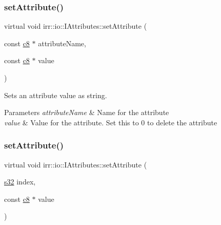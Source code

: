 \subsubsection{\texorpdfstring{set\+Attribute()}{setAttribute()}\hspace{0.1cm}{\footnotesize\ttfamily [1/5]}}
{\footnotesize\ttfamily virtual void irr\+::io\+::\+I\+Attributes\+::set\+Attribute (\begin{DoxyParamCaption}\item[{const \hyperlink{namespaceirr_a9395eaea339bcb546b319e9c96bf7410}{c8} $\ast$}]{attribute\+Name,  }\item[{const \hyperlink{namespaceirr_a9395eaea339bcb546b319e9c96bf7410}{c8} $\ast$}]{value }\end{DoxyParamCaption})\hspace{0.3cm}{\ttfamily [pure virtual]}}



Sets an attribute value as string. 


\begin{DoxyParams}{Parameters}
{\em attribute\+Name} & Name for the attribute \\
\hline
{\em value} & Value for the attribute. Set this to 0 to delete the attribute \\
\hline
\end{DoxyParams}
\mbox{\label{classirr_1_1io_1_1IAttributes_a0d270e61c06e6553857f90946fe177f7}} 
\subsubsection{\texorpdfstring{set\+Attribute()}{setAttribute()}\hspace{0.1cm}{\footnotesize\ttfamily [2/5]}}
{\footnotesize\ttfamily virtual void irr\+::io\+::\+I\+Attributes\+::set\+Attribute (\begin{DoxyParamCaption}\item[{\hyperlink{namespaceirr_ac66849b7a6ed16e30ebede579f9b47c6}{s32}}]{index,  }\item[{const \hyperlink{namespaceirr_a9395eaea339bcb546b319e9c96bf7410}{c8} $\ast$}]{value }\end{DoxyParamCaption})\hspace{0.3cm}{\ttfamily [pure virtual]}}



